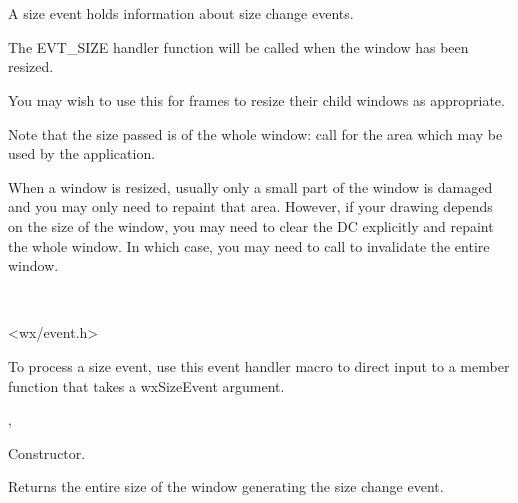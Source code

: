 
\section{}\label{wxsizeevent}

A size event holds information about size change events.

The EVT\_SIZE handler function will be called when the window has been resized.

You may wish to use this for frames to resize their child windows as appropriate.

Note that the size passed is of
the whole window: call  for the area which may be
used by the application.

When a window is resized, usually only a small part of the window is damaged and you
may only need to repaint that area. However, if your drawing depends on the size of the window,
you may need to clear the DC explicitly and repaint the whole window. In which case, you
may need to call  to invalidate the entire window.


\\


<wx/event.h>


To process a size event, use this event handler macro to direct input to a member
function that takes a wxSizeEvent argument.

\twocolwidtha{7cm}
\begin{twocollist}\itemsep=0pt
\end{twocollist}%


,\rtfsp
{}




Constructor.

\label{wxsizeeventgetsize}


Returns the entire size of the window generating the size change event.

